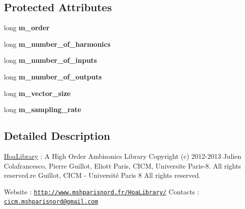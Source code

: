 \subsection*{Protected Attributes}
\begin{DoxyCompactItemize}
\item 
\hypertarget{class_ambisonic_a312690f0d1ba3191c0925a9d5f34cd17}{long {\bfseries m\-\_\-order}}\label{class_ambisonic_a312690f0d1ba3191c0925a9d5f34cd17}

\item 
\hypertarget{class_ambisonic_a91ff538ee47b2f6216f509d7756ea97e}{long {\bfseries m\-\_\-number\-\_\-of\-\_\-harmonics}}\label{class_ambisonic_a91ff538ee47b2f6216f509d7756ea97e}

\item 
\hypertarget{class_ambisonic_a6104162c4457f2d581a44b2e7007d188}{long {\bfseries m\-\_\-number\-\_\-of\-\_\-inputs}}\label{class_ambisonic_a6104162c4457f2d581a44b2e7007d188}

\item 
\hypertarget{class_ambisonic_a6875cb4a3b5e2b80982726df6c769106}{long {\bfseries m\-\_\-number\-\_\-of\-\_\-outputs}}\label{class_ambisonic_a6875cb4a3b5e2b80982726df6c769106}

\item 
\hypertarget{class_ambisonic_a6b10ff076a735555a373e9a83a2e4915}{long {\bfseries m\-\_\-vector\-\_\-size}}\label{class_ambisonic_a6b10ff076a735555a373e9a83a2e4915}

\item 
\hypertarget{class_ambisonic_ad3fb43ea3eb344de999500fbfc570af7}{long {\bfseries m\-\_\-sampling\-\_\-rate}}\label{class_ambisonic_ad3fb43ea3eb344de999500fbfc570af7}

\end{DoxyCompactItemize}


\subsection{Detailed Description}
\hyperlink{interface_hoa_library}{Hoa\-Library} \-: A High Order Ambisonics Library Copyright (c) 2012-\/2013 Julien Colafrancesco, Pierre Guillot, Eliott Paris, C\-I\-C\-M, Universite Paris-\/8. All rights reserved.\-re Guillot, C\-I\-C\-M -\/ Université Paris 8 All rights reserved.

Website \-: \href{http://www.mshparisnord.fr/HoaLibrary/}{\tt http\-://www.\-mshparisnord.\-fr/\-Hoa\-Library/} Contacts \-: \href{mailto:cicm.mshparisnord@gmail.com}{\tt cicm.\-mshparisnord@gmail.\-com}

